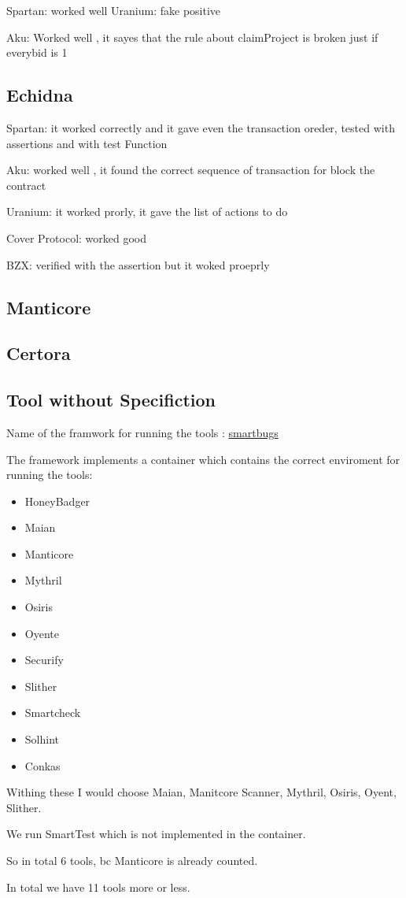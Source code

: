 Spartan: worked well
Uranium: fake positive

Aku: Worked well , it sayes that the rule about claimProject is broken just if everybid is 1 

\subsection {Echidna}
Spartan: it worked correctly and it gave even the transaction oreder, tested with assertions and with test Function

Aku: worked well , it found the correct sequence of transaction for block the contract 

Uranium: it worked prorly, it gave the list of actions to do 

Cover Protocol: worked good


BZX: verified with the assertion but it woked proeprly



\subsection{Manticore}

\subsection{Certora}

\subsection{Tool without Specifiction}
Name of the framwork for running the tools : \href{https://smartbugs.github.io/}{smartbugs}

The framework implements a container which contains the correct enviroment for running the tools: 

\begin{itemize}
    \item HoneyBadger
    \item Maian
    \item Manticore
    \item Mythril
    \item Osiris
    \item Oyente
    \item Securify
    \item Slither
    \item Smartcheck
    \item Solhint
    \item Conkas
\end{itemize}

Withing these I would choose Maian, Manitcore Scanner, Mythril, Osiris, Oyent, Slither.

We run SmartTest which is not implemented in the container.

So in total 6 tools, bc Manticore is already counted.

In total we have 11 tools more or less.


